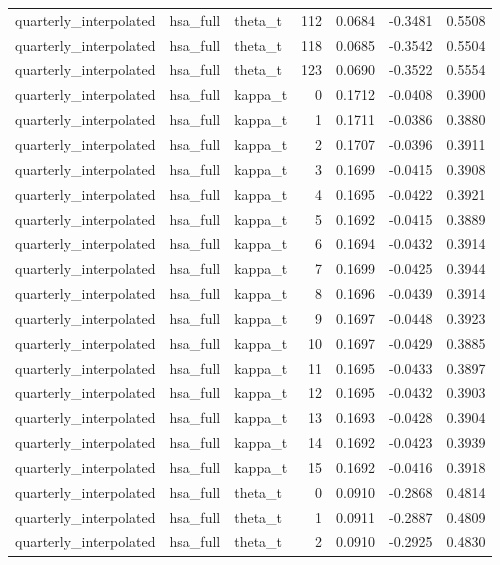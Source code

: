 \begin{tabular}{lllrrrr}
quarterly\_interpolated & hsa\_full & theta\_t & 112 & 0.0684 & -0.3481 & 0.5508 \\
quarterly\_interpolated & hsa\_full & theta\_t & 118 & 0.0685 & -0.3542 & 0.5504 \\
quarterly\_interpolated & hsa\_full & theta\_t & 123 & 0.0690 & -0.3522 & 0.5554 \\
quarterly\_interpolated & hsa\_full & kappa\_t & 0 & 0.1712 & -0.0408 & 0.3900 \\
quarterly\_interpolated & hsa\_full & kappa\_t & 1 & 0.1711 & -0.0386 & 0.3880 \\
quarterly\_interpolated & hsa\_full & kappa\_t & 2 & 0.1707 & -0.0396 & 0.3911 \\
quarterly\_interpolated & hsa\_full & kappa\_t & 3 & 0.1699 & -0.0415 & 0.3908 \\
quarterly\_interpolated & hsa\_full & kappa\_t & 4 & 0.1695 & -0.0422 & 0.3921 \\
quarterly\_interpolated & hsa\_full & kappa\_t & 5 & 0.1692 & -0.0415 & 0.3889 \\
quarterly\_interpolated & hsa\_full & kappa\_t & 6 & 0.1694 & -0.0432 & 0.3914 \\
quarterly\_interpolated & hsa\_full & kappa\_t & 7 & 0.1699 & -0.0425 & 0.3944 \\
quarterly\_interpolated & hsa\_full & kappa\_t & 8 & 0.1696 & -0.0439 & 0.3914 \\
quarterly\_interpolated & hsa\_full & kappa\_t & 9 & 0.1697 & -0.0448 & 0.3923 \\
quarterly\_interpolated & hsa\_full & kappa\_t & 10 & 0.1697 & -0.0429 & 0.3885 \\
quarterly\_interpolated & hsa\_full & kappa\_t & 11 & 0.1695 & -0.0433 & 0.3897 \\
quarterly\_interpolated & hsa\_full & kappa\_t & 12 & 0.1695 & -0.0432 & 0.3903 \\
quarterly\_interpolated & hsa\_full & kappa\_t & 13 & 0.1693 & -0.0428 & 0.3904 \\
quarterly\_interpolated & hsa\_full & kappa\_t & 14 & 0.1692 & -0.0423 & 0.3939 \\
quarterly\_interpolated & hsa\_full & kappa\_t & 15 & 0.1692 & -0.0416 & 0.3918 \\
quarterly\_interpolated & hsa\_full & theta\_t & 0 & 0.0910 & -0.2868 & 0.4814 \\
quarterly\_interpolated & hsa\_full & theta\_t & 1 & 0.0911 & -0.2887 & 0.4809 \\
quarterly\_interpolated & hsa\_full & theta\_t & 2 & 0.0910 & -0.2925 & 0.4830 \\

\end{tabular}

